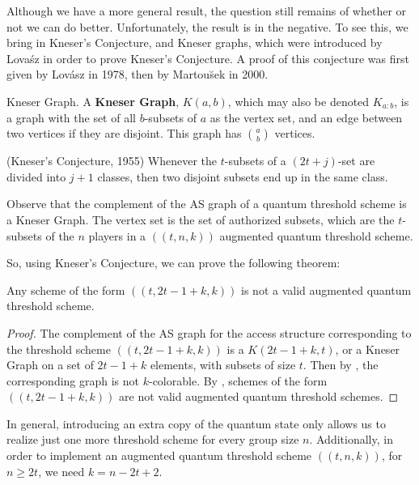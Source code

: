Although we have a more general result, the question still remains of whether or not we can do better. Unfortunately, the result is in the negative. To see this, we bring in Kneser's Conjecture, and Kneser graphs, which were introduced by Lova\'{s}z in order to prove Kneser's Conjecture. A proof of this conjecture was first given by Lov\'asz in 1978, then by Martou\u{s}ek in 2000.

\begin{definition}{Kneser Graph.}
    \label{defn:kneser-graph}
    A \textbf{Kneser Graph}, $K(a,b)$, which may also be denoted $K_{a:b}$, is a graph with the set of all $b$-subsets of $a$ as the vertex set, and an edge between two vertices if they are disjoint. This graph has $\binom{a}{b}$ vertices.  
\end{definition}

\begin{theorem}
    \label{thm:kneser-conjecture}
    (Kneser's Conjecture, 1955) Whenever the $t$-subsets of a $(2t+j)$-set are divided into $j+1$ classes, then two disjoint subsets end up in the same class. 
\end{theorem}

\begin{remark}
    Observe that the complement of the AS graph of a quantum threshold scheme is a Kneser Graph. The vertex set is the set of authorized subsets, which are the $t$-subsets of the $n$ players in a $((t,n,k))$ augmented quantum threshold scheme.
\end{remark}

So, using Kneser's Conjecture, we can prove the following theorem:

\begin{theorem}
    \label{thm:no-more} 
    Any scheme of the form $((t,2t-1+k,k))$ is not a valid augmented quantum threshold scheme.
\end{theorem}

\begin{proof}
    The complement of the AS graph for the access structure corresponding to the threshold scheme $((t,2t-1+k,k))$ is a $K(2t-1+k,t)$, or a Kneser Graph on a set of $2t-1+k$ elements, with subsets of size $t$. Then by , the corresponding graph is not $k$-colorable. By , schemes of the form $((t,2t-1+k,k))$ are not valid augmented quantum threshold schemes.
\end{proof}

In general, introducing an extra copy of the quantum state only allows us to realize just one more threshold scheme for every group size $n$. Additionally, in order to implement an augmented quantum threshold scheme $((t,n,k))$, for $n \geq 2t$, we need $k = n - 2t + 2$.

